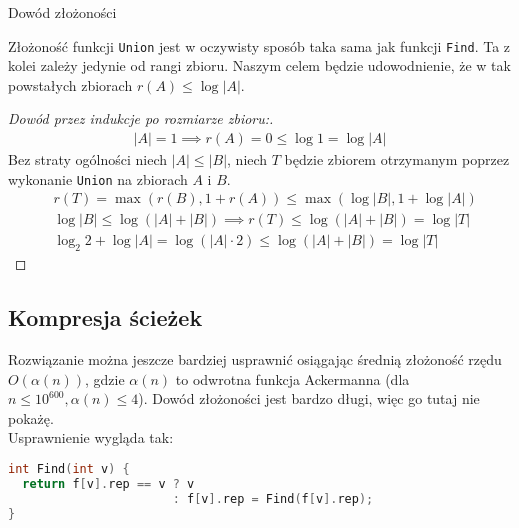 \documentclass[../main.tex]{subfiles}
\begin{document}
\begin{frame}{\subsecname}{Dowód złożoności}

Złożoność funkcji \lstinline{Union} jest w oczywisty sposób taka sama jak funkcji
\lstinline{Find}. Ta z kolei zależy jedynie od rangi zbioru. Naszym celem będzie udowodnienie, 
że w tak powstałych zbiorach $r(A) \le \log{|A|}$.\\
\pause
\begin{proof}[Dowód przez indukcje po rozmiarze zbioru:]{}
\begin{align*}
  |A| = 1 \implies r(A) = 0 \le \log{1} = \log{|A|}
\end{align*}
\pause
Bez straty ogólności niech $|A| \le |B|$, niech $T$ będzie zbiorem otrzymanym poprzez wykonanie
\lstinline{Union} na zbiorach $A$ i $B$.
\begin{align*}
  &r(T) = \max (r(B), 1 + r(A)) \le \max ( \log{|B|}, 1 + \log{|A|} )\\
  &\log{|B|} \le \log{(|A| + |B|)} \implies r(T) \le \log{(|A| + |B|)} = \log{|T|}\\
  &\log_2{2} + \log{|A|} = \log{(|A| \cdot 2)} \le \log{(|A| + |B|)} = \log{|T|}
\end{align*}
\end{proof}

\end{frame}

\subsection{Kompresja ścieżek}

\begin{frame}[fragile]{\subsecname}

Rozwiązanie można jeszcze bardziej usprawnić osiągając średnią złożoność rzędu $O(\alpha(n))$,
gdzie $\alpha(n)$ to odwrotna funkcja Ackermanna (dla $n\le 10^{600}, \alpha(n) \le 4$). Dowód
złożoności jest bardzo długi, więc go tutaj nie pokażę.\\
\pause
Usprawnienie wygląda tak:

\begin{block}{}
\begin{lstlisting}[language = C++]
int Find(int v) {
  return f[v].rep == v ? v
                       : f[v].rep = Find(f[v].rep);
}
\end{lstlisting}
\end{block}

\end{frame}
\end{document}
